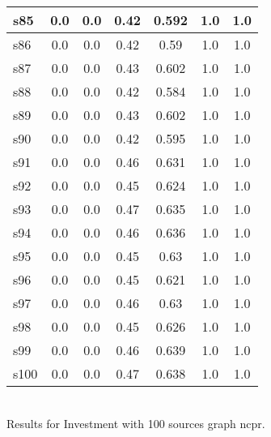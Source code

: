 \documentclass{article}
\begin{document}
\begin{tabular}{|l|c|c|c|c|c|c|}
\hline
s85 &0.0 & 0.0 & 0.42 & 0.592 & 1.0 & 1.0\\
\hline
s86 &0.0 & 0.0 & 0.42 & 0.59 & 1.0 & 1.0\\
\hline
s87 &0.0 & 0.0 & 0.43 & 0.602 & 1.0 & 1.0\\
\hline
s88 &0.0 & 0.0 & 0.42 & 0.584 & 1.0 & 1.0\\
\hline
s89 &0.0 & 0.0 & 0.43 & 0.602 & 1.0 & 1.0\\
\hline
s90 &0.0 & 0.0 & 0.42 & 0.595 & 1.0 & 1.0\\
\hline
s91 &0.0 & 0.0 & 0.46 & 0.631 & 1.0 & 1.0\\
\hline
s92 &0.0 & 0.0 & 0.45 & 0.624 & 1.0 & 1.0\\
\hline
s93 &0.0 & 0.0 & 0.47 & 0.635 & 1.0 & 1.0\\
\hline
s94 &0.0 & 0.0 & 0.46 & 0.636 & 1.0 & 1.0\\
\hline
s95 &0.0 & 0.0 & 0.45 & 0.63 & 1.0 & 1.0\\
\hline
s96 &0.0 & 0.0 & 0.45 & 0.621 & 1.0 & 1.0\\
\hline
s97 &0.0 & 0.0 & 0.46 & 0.63 & 1.0 & 1.0\\
\hline
s98 &0.0 & 0.0 & 0.45 & 0.626 & 1.0 & 1.0\\
\hline
s99 &0.0 & 0.0 & 0.46 & 0.639 & 1.0 & 1.0\\
\hline
s100 &0.0 & 0.0 & 0.47 & 0.638 & 1.0 & 1.0\\
\hline
\end{tabular}\\

\noindent Results for Investment with 100 sources graph ncpr.
\end{document}
